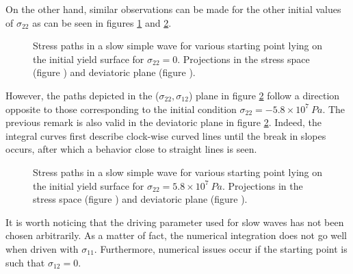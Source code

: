 On the other hand, similar observations can be made for the other initial values of $\sigma_{22}$ as can be seen in figures \ref{fig:slow_path_plane_stress2} and \ref{fig:slow_path_plane_stress3}.
\begin{figure}[h!]
  \centering
  \caption{Stress paths in a slow simple wave for various starting point lying on the initial yield surface for $\sigma_{22}=0$. Projections in the stress space (figure ) and deviatoric plane (figure ).}
  \label{fig:slow_path_plane_stress2}
\end{figure}
However, the paths depicted in the ($\sigma_{22},\sigma_{12}$) plane in figure \ref{fig:slow_path_plane_stress3} follow a direction opposite to those corresponding to the initial condition $\sigma_{22}=-5.8\times 10^7 \: Pa$.
The previous remark is also valid in the deviatoric plane in figure \ref{fig:slow_path_plane_stress3}.
Indeed, the integral curves first describe clock-wise curved lines until the break in slopes occurs, after which a behavior close to straight lines is seen.
\begin{figure}[h!]
  \centering
  \caption{Stress paths in a slow simple wave for various starting point lying on the initial yield surface for $\sigma_{22}=5.8\times 10^7 \: Pa$. Projections in the stress space (figure ) and deviatoric plane (figure ).}
  \label{fig:slow_path_plane_stress3}
\end{figure}
It is worth noticing that the driving parameter used for slow waves has not been chosen arbitrarily.
As a matter of fact, the numerical integration does not go well when driven with $\sigma_{11}$.
Furthermore, numerical issues occur if the starting point is such that $\sigma_{12}=0$.


